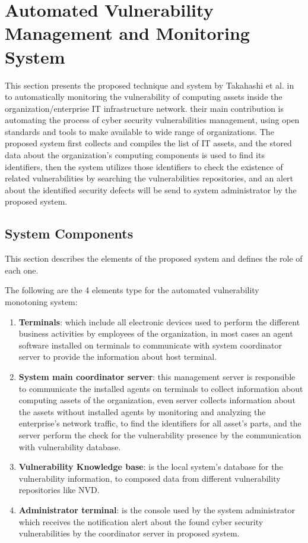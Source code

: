 \documentclass{llncs}
\begin{document}
\section{Automated Vulnerability Management and Monitoring System}

This section presents the proposed technique and system by Takahashi et al. in \cite{paper1} to automatically monitoring the vulnerability of computing assets
inside the organization/enterprise IT infrastructure network. their main contribution is automating the process of cyber security vulnerabilities management, using open standards and tools to make available to wide range of organizations.
 The proposed system first collects and compiles the list of IT assets, and the stored data about the organization's computing components is used to find its identifiers, then the system  utilizes those identifiers to check the existence of related vulnerabilities by searching the vulnerabilities repositories, and an alert about the identified security defects will be send to system administrator by the proposed system.
    
\subsection{System Components}

This section describes the elements of the proposed system and defines the role of each one. 

The following are the 4 elements type for the automated vulnerability monotoning system:

\renewcommand{\labelenumi}{\Roman{enumi}}
 \begin{enumerate}
 \item \textbf{Terminals}: which include all electronic devices used to perform the different business activities by employees of the organization, in most cases
 an agent software installed on terminals to communicate with system coordinator server to provide the information about host terminal.
 
 \item \textbf{System main coordinator server}: this management server is responsible to communicate the installed agents on terminals to collect information about computing assets of the organization, even server collects information about the assets without installed agents by monitoring and analyzing the enterprise's network traffic, to find the identifiers for all asset's parts, and  the server perform the check for the vulnerability presence by the communication with vulnerability database. 
 
 \item \textbf{Vulnerability Knowledge base}: is the local system's database for the vulnerability information, to composed data from different vulnerability repositories like NVD.
 
 
  \item \textbf{Administrator terminal}: is the console used by the system administrator which receives the notification alert about the found cyber security vulnerabilities by the coordinator server in proposed system.   
 \end{enumerate}
 
\end{document}
